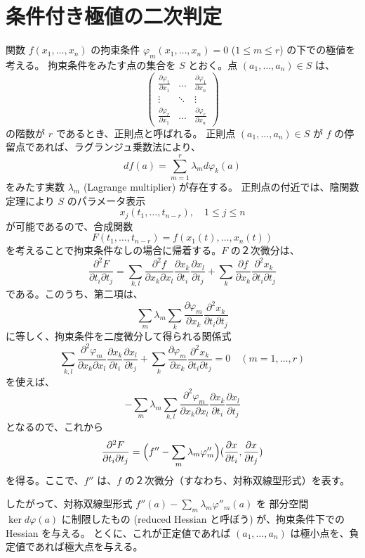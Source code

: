 \documentclass[a4paper]{jsarticle}
\theoremstyle{definition}
\theoremstyle{remark}
\begin{document}
\section{条件付き極値の二次判定}
関数 $f(x_1,\dots,x_n)$ の拘束条件 
$\varphi_m(x_1,\dots,x_n) = 0$ ($1 \leq m \leq r$) の下での極値を考える。
拘束条件をみたす点の集合を $S$ とおく。点 $(a_1,\dots,a_n) \in S$ は、
\[
\begin{pmatrix}
\frac{\partial \varphi_1}{\partial x_1} & \dots & \frac{\partial \varphi_1}{\partial x_n}\\  
\vdots & \ddots & \vdots\\  
\frac{\partial \varphi_r}{\partial x_1} & \dots & \frac{\partial \varphi_r}{\partial x_n}
\end{pmatrix}
\]
の階数が $r$ であるとき、正則点と呼ばれる。
正則点 $(a_1,\dots,a_n) \in S$ が $f$ の停留点であれば、ラグランジュ乗数法により、
\[
df(a) = \sum_{m=1}^r \lambda_m d\varphi_k(a)
\]
をみたす実数 $\lambda_m$ (Lagrange multiplier) が存在する。
正則点の付近では、陰関数定理により $S$ のパラメータ表示
\[
x_j(t_1,\dots,t_{n-r}), 
\quad 
1 \leq j \leq n
\]
が可能であるので、合成関数
\[
F(t_1,\dots,t_{n-r}) = f(x_1(t),\dots,x_n(t))
\]
を考えることで拘束条件なしの場合に帰着する。$F$ の２次微分は、
\[
\frac{\partial^2 F}{\partial t_i \partial t_j} = 
\sum_{k,l} \frac{\partial^2 f}{\partial x_k\partial x_l} 
\frac{\partial x_k}{\partial t_i} 
\frac{\partial x_l}{\partial t_j} 
+ \sum_k \frac{\partial f}{\partial x_k} 
\frac{\partial^2 x_k}{\partial t_i \partial t_j} 
\]
である。このうち、第二項は、
\[
\sum_m \lambda_m \sum_k \frac{\partial \varphi_m}{\partial x_k} 
\frac{\partial^2 x_k}{\partial t_i \partial t_j}
\]
に等しく、拘束条件を二度微分して得られる関係式
\[
\sum_{k,l} \frac{\partial^2 \varphi_m}{\partial x_k \partial x_l} 
\frac{\partial x_k}{\partial t_i} \frac{\partial x_l}{\partial t_j} 
+ \sum_k \frac{\partial \varphi_m}{\partial x_k} 
\frac{\partial^2 x_k}{\partial t_i \partial t_j} = 0 
\quad 
(m=1, \dots, r)
\]
を使えば、
\[
- \sum_m \lambda_m \sum_{k,l} \frac{\partial^2 \varphi_m}{\partial x_k \partial x_l} 
\frac{\partial x_k}{\partial t_i} \frac{\partial x_l}{\partial t_j} 
\]
となるので、これから
\[
\frac{\partial^2 F}{\partial t_i \partial t_j} = 
\Bigl(f'' - \sum_m \lambda_m \varphi''_m\Bigr) 
(\frac{\partial x}{\partial t_i}, \frac{\partial x}{\partial t_j})
\]
を得る。ここで、$f''$ は、$f$ の２次微分（すなわち、対称双線型形式）を表す。

したがって、対称双線型形式 $f''(a) - \sum_m \lambda_m \varphi''_m(a)$ を
部分空間 $\ker d\varphi(a)$ に制限したもの (reduced Hessian と呼ぼう) が、拘束条件下での Hessian を与える。
とくに、これが正定値であれば $(a_1,\dots, a_n)$ は極小点を、負定値であれば極大点を与える。
\end{document}
